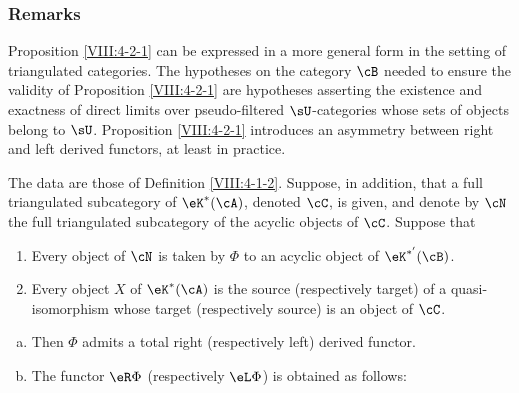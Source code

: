 \subsubsection{Remarks}\label{VIII:4-2-2}

Proposition \ref{VIII:4-2-1} can be expressed in a more general form in
the setting of triangulated categories. The hypotheses on the category
$\cB$ needed to ensure the validity of Proposition \ref{VIII:4-2-1} are
hypotheses asserting the existence and exactness of direct limits over
pseudo-filtered $\sU$-categories whose sets of objects belong to $\sU$.
Proposition \ref{VIII:4-2-1} introduces an asymmetry between right and
left derived functors, at least in practice.

\begin{theorem}\label{VIII:4-2-3} %
The data are those of Definition \ref{VIII:4-1-2}. Suppose, in addition,
that a full triangulated subcategory of $\eK^\ast(\cA)$, denoted $\cC$, is given,
and denote by $\cN$ the full triangulated subcategory of the acyclic
objects of $\cC$. Suppose that
\begin{enumerate}[(1)]
  \item Every object of $\cN$ is taken by $\Phi$ to an acyclic object of
    $\eK^{\ast'}(\cB)$.
  \item Every object $X$ of $\eK^\ast(\cA)$ is the source (respectively
    target) of a quasi-isomorphism whose target (respectively source) is
    an object of $\cC$.
\end{enumerate}
\begin{enumerate}[a)]
  \item Then $\Phi$ admits a total right (respectively left) derived
    functor.
  \item {}The functor $\eR \Phi$ (respectively $\eL \Phi$) is obtained as
    follows:


\end{enumerate}
\end{theorem}
